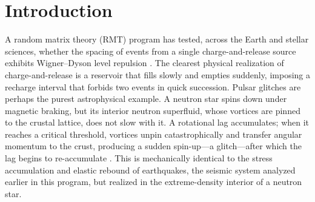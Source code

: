 \documentclass[12pt,a4paper]{article}
\begin{document}
\begin{abstract}
\vspace{0.8em}
\noindent\textbf{Keywords:} random matrix theory; pulsar glitches; neutron stars; superfluid vortices; level repulsion; charge-and-release; J0537$-$6910; Crab pulsar

\vspace{0.4em}
\noindent\textbf{Code and data:} \url{https://github.com/Ruqing1963/pulsar-glitch-rmt}

\vspace{0.2em}
\noindent\textbf{Companion studies:} stratigraphy \url{https://zenodo.org/records/20774581}; seismotectonics \url{https://zenodo.org/records/20768130}; mantle plumes \url{https://zenodo.org/records/20768420}; metallogeny \url{https://zenodo.org/records/20768849}; evolution \url{https://zenodo.org/records/20783763}; hydrogeology \url{https://zenodo.org/records/20780389}; solar flares \url{https://zenodo.org/records/20784967}; orbital architecture \url{https://zenodo.org/records/20785613}; lunar craters \url{https://zenodo.org/records/20787412}; geomagnetic reversals \url{https://zenodo.org/records/20788648}
\end{abstract}

\section{Introduction}

A random matrix theory (RMT) program has tested, across the Earth and stellar sciences, whether the spacing of events from a single charge-and-release source exhibits Wigner--Dyson level repulsion \citep{chen2026plume,chen2026solar,chen2026geomag}. The clearest physical realization of charge-and-release is a reservoir that fills slowly and empties suddenly, imposing a recharge interval that forbids two events in quick succession. Pulsar glitches are perhaps the purest astrophysical example. A neutron star spins down under magnetic braking, but its interior neutron superfluid, whose vortices are pinned to the crustal lattice, does not slow with it. A rotational lag accumulates; when it reaches a critical threshold, vortices unpin catastrophically and transfer angular momentum to the crust, producing a sudden spin-up---a glitch---after which the lag begins to re-accumulate \citep{anderson1975,haskell2015}. This is mechanically identical to the stress accumulation and elastic rebound of earthquakes, the seismic system analyzed earlier in this program, but realized in the extreme-density interior of a neutron star.
\end{document}
